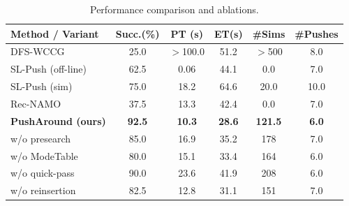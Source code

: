 \begin{table}[t]
  \centering
  \begin{threeparttable}
  \caption{Performance comparison and ablations.}
  \label{tab:main_ablation}
  \vspace{2pt}
  \setlength{\tabcolsep}{2.5pt}
  \renewcommand{\arraystretch}{0.95}
  \begin{tabular}{lccccc}
  \toprule
  Method / Variant & Succ.(\%) & PT (s) & ET(s) & \#Sims & \#Pushes \\
  \midrule
   DFS-WCCG             & 25.0  & $>$100.0  & 51.2     & $>$500    & 8.0   \\
  SL-Push (off-line)   & 62.5  & 0.06  & 44.1   & 0.0   & 7.0  \\
  SL-Push (sim)        & 75.0  & 18.2  & 64.6   & 20.0 & 10.0  \\
  Rec-NAMO             & 37.5  & 13.3  & 42.4   & 0.0   & 7.0  \\
  \textbf{PushAround (ours)} & \textbf{92.5} & \textbf{10.3} & \textbf{28.6} & \textbf{121.5} & \textbf{6.0} \\
  \midrule
  w/o presearch        & 85.0 & 16.9 & 35.2 & 178 & 7.0 \\
  w/o ModeTable        & 80.0 & 15.1 & 33.4  & 164 & 6.0 \\
  w/o quick-pass       & 90.0 & 23.6 & 41.9  & 208 & 6.0 \\
  w/o reinsertion      & 82.5 & 12.8 & 31.1  & 151 & 7.0 \\
  \bottomrule
  \end{tabular}
  \end{threeparttable}
  \vspace{-4mm}
\end{table}


